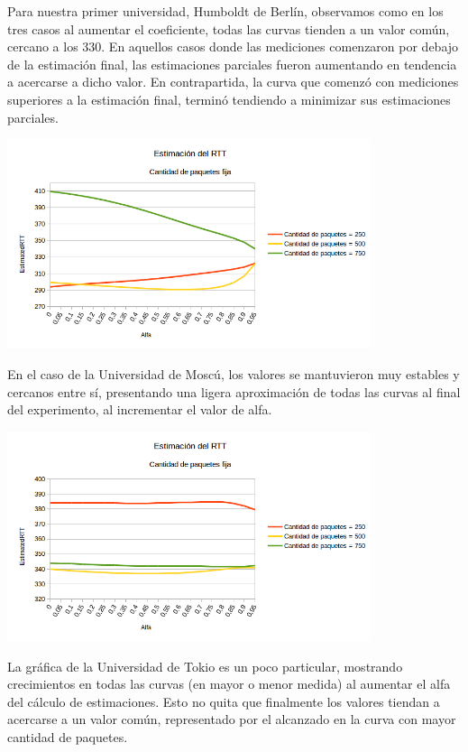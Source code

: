 Para nuestra primer universidad, Humboldt de Berlín, observamos como en los tres casos al aumentar el coeficiente, todas las curvas tienden a un valor común, cercano a los 330. En aquellos casos donde las mediciones comenzaron por debajo de la estimación final, las estimaciones parciales fueron aumentando en tendencia a acercarse a dicho valor. En contrapartida, la curva que comenzó con mediciones superiores a la estimación final, terminó tendiendo a minimizar sus estimaciones parciales.

\centerline{\includegraphics[width=0.8\textwidth]{imagenes/3ra_parte/ping_varios_n_fijo_variando_alfa_alemania.png}}

En el caso de la Universidad de Moscú, los valores se mantuvieron muy estables y cercanos entre sí, presentando una ligera aproximación de todas las curvas al final del experimento, al incrementar el valor de alfa.

\centerline{\includegraphics[width=0.8\textwidth]{imagenes/3ra_parte/ping_varios_n_fijo_variando_alfa_rusia.png}}

La gráfica de la Universidad de Tokio es un poco particular, mostrando crecimientos en todas las curvas (en mayor o menor medida) al aumentar el alfa del cálculo de estimaciones. Esto no quita que finalmente los valores tiendan a acercarse a un valor común, representado por el alcanzado en la curva con mayor cantidad de paquetes.

